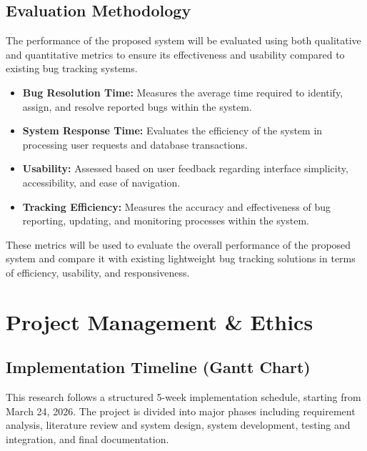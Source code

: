 \documentclass[12pt]{article}
\begin{document}
\subsection{Evaluation Methodology}

The performance of the proposed system will be evaluated using both qualitative and quantitative metrics to ensure its effectiveness and usability compared to existing bug tracking systems.

\begin{itemize}
    \item \textbf{Bug Resolution Time:} Measures the average time required to identify, assign, and resolve reported bugs within the system.

    \item \textbf{System Response Time:} Evaluates the efficiency of the system in processing user requests and database transactions.

    \item \textbf{Usability:} Assessed based on user feedback regarding interface simplicity, accessibility, and ease of navigation.

    \item \textbf{Tracking Efficiency:} Measures the accuracy and effectiveness of bug reporting, updating, and monitoring processes within the system.
\end{itemize}

These metrics will be used to evaluate the overall performance of the proposed system and compare it with existing lightweight bug tracking solutions in terms of efficiency, usability, and responsiveness.

\section{Project Management \& Ethics}



\subsection{Implementation Timeline (Gantt Chart)}

This research follows a structured 5-week implementation schedule, starting from March 24, 2026. The project is divided into major phases including requirement analysis, literature review and system design, system development, testing and integration, and final documentation.
\end{document}
